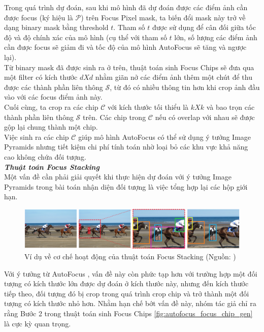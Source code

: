 {    \noindent
    Trong quá trình dự đoán, sau khi mô hình đã dự đoán được các điểm ảnh cần được focus (ký hiệu là $\mathcal{P}$) trên Focus Pixel  mask, ta biến đổi mask này trở về dạng binary mask bằng threshold $t$.
    Tham số $t$ được sử dụng để cân đối giữa tốc độ và độ chính xác của mô hình (cụ thể với tham số $t$ lớn, số lượng các điểm ảnh cần được focus sẽ giảm đi và tốc độ của mô hình AutoFocus sẽ tăng và ngược lại). \\
    Từ binary mask đã được sinh ra ở trên, thuật toán sinh Focus Chips sẽ đưa qua một filter có kích thước $d X d$ nhằm giãn nở các điểm ảnh thêm một chút để thu được các thành phần liên thông $\mathcal{S}$, từ đó có nhiều thông tin hơn khi crop ảnh đầu vào với các focus điểm ảnh này. \\
    Cuối cùng, ta crop ra các chip $\mathcal{C}$ với kích thước tối thiểu là $k X k$ và bao trọn các thành phần liên thông $\mathcal{S}$ trên.
    Các chip trong $\mathcal{C}$ nếu có overlap với nhau sẽ được gộp lại chung thành một chip. \\
    Việc sinh ra các chip $\mathcal{C}$ giúp mô hình AutoFocus có thể sử dụng ý tưởng Image Pyramids nhưng tiết kiệm chi phí tính toán nhờ loại bỏ các khu vực khả năng cao không chứa đối tượng. \\

    \noindent
    \textbf{\textit{Thuật toán Focus Stacking}} \\
    Một vấn đề cần phải giải quyết khi thực hiện dự đoán với ý tưởng Image Pyramids trong bài toán nhận diện đối tượng là việc tổng hợp lại các hộp giới hạn.

    \begin{figure}[H]
        \centering
        \includegraphics[width=15cm] {images/autofocus_focus_stack}
        \caption{Ví dụ về cơ chế hoạt động của thuật toán Focus Stacking (Nguồn: \cite{najibi2019autofocus})}
        \label{fig:autofocus_focus_stack}
    \end{figure}

    \noindent
    Với ý tưởng từ AutoFocus \cite{najibi2019autofocus}, vấn đề này còn phức tạp hơn với trường hợp một đối tượng có kích thước lớn được dự đoán ở kích thước này, nhưng đến kích thước tiếp theo, đối tượng đó bị crop trong quá trình crop chip và trở thành một đối tượng có kích thước nhỏ hơn.
    Nhằm hạn chế bớt vấn đề này, nhóm tác giả chỉ ra rằng Bước 2 trong thuật toán sinh Focus Chips \ref{fig:autofocus_focus_chip_gen} là cực kỳ quan trọng.

}
